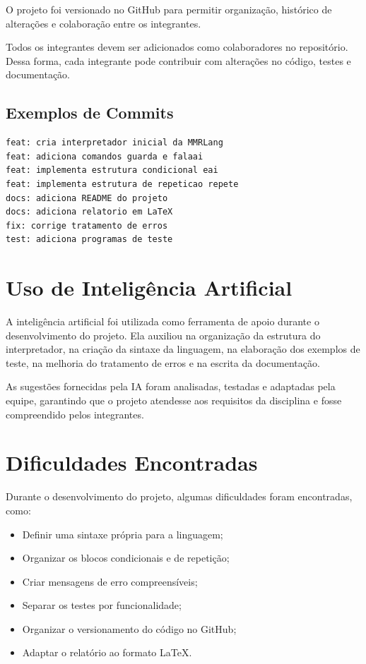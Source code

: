 \documentclass[12pt,a4paper]{article}
\begin{document}
O projeto foi versionado no GitHub para permitir organização, histórico de alterações e colaboração entre os integrantes.

Todos os integrantes devem ser adicionados como colaboradores no repositório. Dessa forma, cada integrante pode contribuir com alterações no código, testes e documentação.

\subsection{Exemplos de Commits}

\begin{lstlisting}
feat: cria interpretador inicial da MMRLang
feat: adiciona comandos guarda e falaai
feat: implementa estrutura condicional eai
feat: implementa estrutura de repeticao repete
docs: adiciona README do projeto
docs: adiciona relatorio em LaTeX
fix: corrige tratamento de erros
test: adiciona programas de teste
\end{lstlisting}

\section{Uso de Inteligência Artificial}

A inteligência artificial foi utilizada como ferramenta de apoio durante o desenvolvimento do projeto. Ela auxiliou na organização da estrutura do interpretador, na criação da sintaxe da linguagem, na elaboração dos exemplos de teste, na melhoria do tratamento de erros e na escrita da documentação.

As sugestões fornecidas pela IA foram analisadas, testadas e adaptadas pela equipe, garantindo que o projeto atendesse aos requisitos da disciplina e fosse compreendido pelos integrantes.

\section{Dificuldades Encontradas}

Durante o desenvolvimento do projeto, algumas dificuldades foram encontradas, como:

\begin{itemize}
\item Definir uma sintaxe própria para a linguagem;
\item Organizar os blocos condicionais e de repetição;
\item Criar mensagens de erro compreensíveis;
\item Separar os testes por funcionalidade;
\item Organizar o versionamento do código no GitHub;
\item Adaptar o relatório ao formato LaTeX.
\end{itemize}
\end{document}
